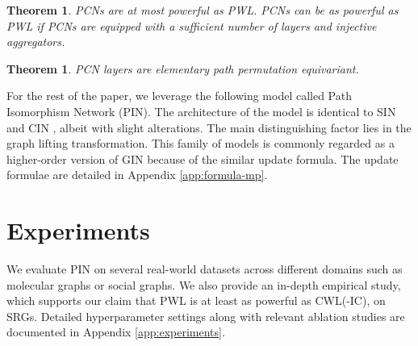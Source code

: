 \documentclass[letterpaper]{article} \usepackage{aaai24}  \usepackage{times}  \usepackage{helvet}  \usepackage{courier}  \usepackage[hyphens]{url}  \usepackage{graphicx} \urlstyle{rm} \def\UrlFont{\rm}  \usepackage{natbib}  \usepackage{caption} \frenchspacing  \setlength{\pdfpagewidth}{8.5in} \setlength{\pdfpageheight}{11in} \usepackage{algorithm}
\newtheorem{theorem}[definition]{Theorem}
\begin{document}
\begin{theorem}
    PCNs are at most powerful as PWL. PCNs can be as powerful as PWL if PCNs are equipped with a sufficient number of layers and injective aggregators.
\end{theorem}

\begin{theorem}
    PCN layers are elementary path permutation equivariant.
\end{theorem} 
For the rest of the paper, we leverage the following model called Path Isomorphism Network (PIN). The architecture of the model is identical to SIN \cite{bodnar_weisfeiler_2021} and CIN \cite{bodnar_weisfeiler_2022}, albeit with slight alterations. The main distinguishing factor lies in the graph lifting transformation. This family of models is commonly regarded as a higher-order version of GIN \cite{xu_how_2019} because of the similar update formula. The update formulae are detailed in Appendix \ref{app:formula-mp}.

\section{Experiments} \label{section:experiments}

We evaluate PIN on several real-world datasets across different domains such as molecular graphs or social graphs. We also provide an in-depth empirical study, which supports our claim that PWL is at least as powerful as CWL(-IC), on SRGs. Detailed hyperparameter settings along with relevant ablation studies are documented in Appendix \ref{app:experiments}.
\end{document}
